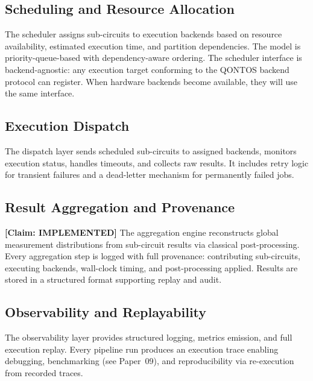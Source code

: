 \documentclass[conference]{IEEEtran}
\begin{document}
\subsection{Scheduling and Resource Allocation}

The scheduler assigns sub-circuits to execution backends based on resource availability, estimated execution time, and partition dependencies. The model is priority-queue-based with dependency-aware ordering. The scheduler interface is backend-agnostic: any execution target conforming to the QONTOS backend protocol can register. When hardware backends become available, they will use the same interface.

\subsection{Execution Dispatch}

The dispatch layer sends scheduled sub-circuits to assigned backends, monitors execution status, handles timeouts, and collects raw results. It includes retry logic for transient failures and a dead-letter mechanism for permanently failed jobs.

\subsection{Result Aggregation and Provenance}

\textbf{[Claim: IMPLEMENTED]} The aggregation engine reconstructs global measurement distributions from sub-circuit results via classical post-processing. Every aggregation step is logged with full provenance: contributing sub-circuits, executing backends, wall-clock timing, and post-processing applied. Results are stored in a structured format supporting replay and audit.

\subsection{Observability and Replayability}

The observability layer provides structured logging, metrics emission, and full execution replay. Every pipeline run produces an execution trace enabling debugging, benchmarking (see Paper~09), and reproducibility via re-execution from recorded traces.
\end{document}
